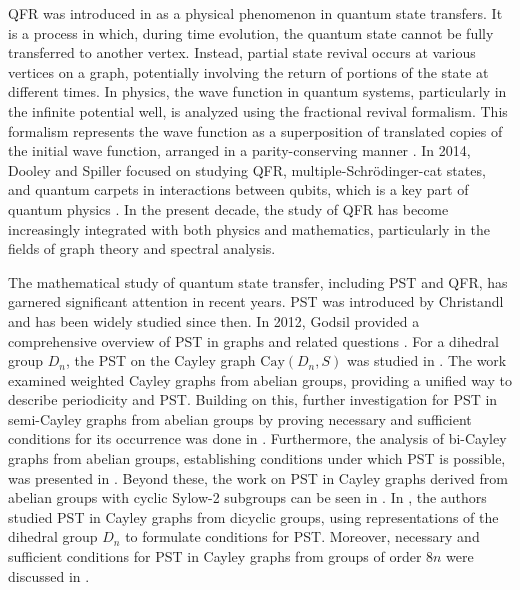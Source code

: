 \documentclass[12pt]{amsart}
\numberwithin{equation}{section}
\theoremstyle{definition}
\theoremstyle{definition} \numberwithin{equation}{section}
\begin{document}
QFR was introduced in \cite{RM} as a physical phenomenon in quantum state transfers. It is a process in which, during time evolution, the quantum state cannot be fully transferred to another vertex. Instead, partial state revival occurs at various vertices on a graph, potentially involving the return of portions of the state at different times. 
In physics, the wave function in quantum systems, particularly in the infinite potential well, is analyzed using the fractional revival formalism. This formalism represents the wave function as a superposition of translated copies of the initial wave function, arranged in a parity-conserving manner \cite{AD}. In 2014, Dooley and Spiller focused on studying QFR, multiple-Schr{\"o}dinger-cat states, and quantum carpets in interactions between qubits, which is a key part of quantum physics \cite{DS}. In the present decade, the study of QFR has become increasingly integrated with both physics and mathematics, particularly in the fields of graph theory and spectral analysis.

The mathematical study of quantum state transfer, including PST and QFR, has garnered significant attention in recent years. PST was introduced by Christandl \cite{CM} and has been widely studied since then. In 2012, Godsil provided a comprehensive overview of PST in graphs and related questions \cite{GC2}. For a dihedral group $D_n$, the PST on the Cayley graph
$\text{Cay}(D_n, S)$ was studied in \cite{CX}. The work \cite{CX2} examined weighted Cayley graphs from abelian groups, providing a unified way to describe periodicity and PST. 
Building on this, further investigation for PST in semi-Cayley graphs from abelian groups by proving necessary and sufficient conditions for its occurrence was done in \cite{AM}. Furthermore, the analysis of bi-Cayley graphs from abelian groups, establishing conditions under which PST is possible, was presented in \cite{WS}. Beyond these, the work on PST in Cayley graphs derived from abelian groups with cyclic Sylow-2 subgroups can be seen in \cite{AAS}. In \cite{AM2}, the authors studied PST in Cayley graphs from dicyclic groups, using representations of the dihedral group $D_n$ to formulate conditions for PST. 
 Moreover, necessary and sufficient conditions for PST in Cayley graphs from groups of order $8n$ were discussed in \cite{KA}.
  
\end{document}
